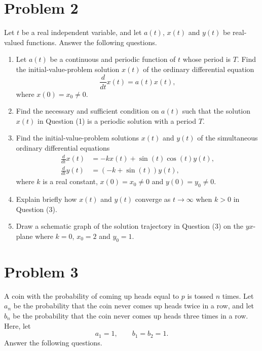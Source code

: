 \documentclass[10pt,a4paper]{article}
\begin{document}
\section*{Problem 2}

Let $t$ be a real independent variable, and let $a(t)$, $x(t)$ and $y(t)$ be real-valued functions. Answer the following questions.

\begin{enumerate}
  \item Let $a(t)$ be a continuous and periodic function of $t$ whose period is $T$. Find the initial-value-problem solution $x(t)$ of the ordinary differential equation
        \[
          \frac{d}{dt}x(t)=a(t)x(t),
        \]
        where $x(0)=x_0\neq 0$.

  \item Find the necessary and sufficient condition on $a(t)$ such that the solution $x(t)$ in Question (1) is a periodic solution with a period $T$.

  \item Find the initial-value-problem solutions $x(t)$ and $y(t)$ of the simultaneous ordinary differential equations
        \[
          \begin{aligned}
            \frac{d}{dt}x(t)&=-kx(t)+\sin(t)\cos(t)y(t),\\
            \frac{d}{dt}y(t)&=(-k+\sin(t))y(t),
          \end{aligned}
        \]
        where $k$ is a real constant, $x(0)=x_0\neq 0$ and $y(0)=y_0\neq 0$.

  \item Explain briefly how $x(t)$ and $y(t)$ converge as $t\to\infty$ when $k>0$ in Question (3).

  \item Draw a schematic graph of the solution trajectory in Question (3) on the $yx$-plane where $k=0$, $x_0=2$ and $y_0=1$.
\end{enumerate}

\section*{Problem 3}

A coin with the probability of coming up heads equal to $p$ is tossed $n$ times. Let $a_n$ be the probability that the coin never comes up heads twice in a row, and let $b_n$ be the probability that the coin never comes up heads three times in a row. Here, let
\[
  a_1=1,\qquad b_1=b_2=1.
\]
Answer the following questions.
\end{document}
